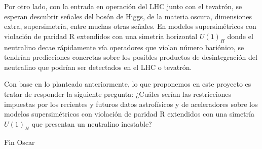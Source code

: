 Por otro lado, con la entrada en operación del LHC junto con el tevatrón, 
se esperan descubrir señales del bosón de Higgs, de la materia oscura, dimensiones extra, 
supersimetría, entre muchas otras señales.  En modelos supersimétricos con violación de paridad R 
extendidos con una simetría horizontal $U(1)_H$ donde el neutralino decae rápidamente vía operadores 
que violan número bariónico, se tendrían predicciones concretas sobre los posibles productos de 
desintegración del neutralino que podrían ser detectados en el LHC o tevatrón.

Con base en lo planteado anteriormente, lo que proponemos en este proyecto es 
tratar de responder la siguiente pregunta: ¿Cuáles serían las restricciones 
impuestas por los recientes y futuros datos astrofísicos y de aceleradores sobre 
los modelos supersimétricos con violación de paridad R extendidos con una simetría $U(1)_H$ que presentan un neutralino inestable?

Fin Oscar

